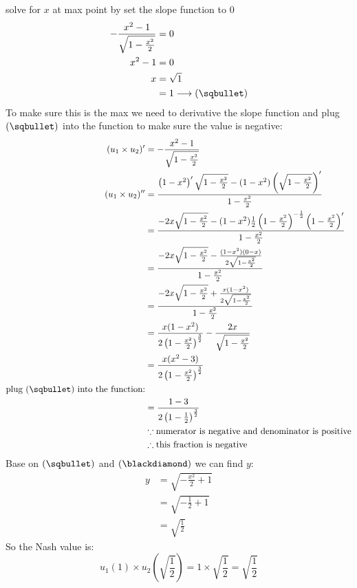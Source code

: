 \documentclass{article}
\begin{document}
solve for $x$ at max point by set the slope function to $0$
\begin{align*}
-\frac{x^2 - 1}{\sqrt{1 - \frac{x^2}{2}}} &= 0\\
x^2 - 1 &= 0\\
x &= \sqrt{1}\\
&= 1 \longrightarrow (\sqbullet)
\end{align*} 
To make sure this is the max we need to derivative the slope function and plug $(\sqbullet)$ into the function to make sure the value is negative:
\begin{align*}
(u_1 \times u_2)' &= -\frac{x^2 - 1}{\sqrt{1 - \frac{x^2}{2}}}\\
(u_1 \times u_2)'' &= \frac{\left(1-x^2\right)'\sqrt{1 - \frac{x^2}{2}} - (1-x^2)\left(\sqrt{1 - \frac{x^2}{2}}\right)'}{1- \frac{x^2}{2}}\\
&= \frac{-2x\sqrt{1-\frac{x^2}{2}} - (1-x^2)\frac{1}{2}\left(1-\frac{x^2}{2}\right)^{-\frac{1}{2}}\left(1-\frac{x^2}{2}\right)'}{1-\frac{x^2}{2}}\\
&= \frac{-2x\sqrt{1-\frac{x^2}{2}} - \frac{(1-x^2)(0-x)}{2\sqrt{1 - \frac{x^2}{2}}}}{1-\frac{x^2}{2}}\\
&= \frac{-2x\sqrt{1-\frac{x^2}{2}} + \frac{x(1-x^2)}{2\sqrt{1 - \frac{x^2}{2}}}}{1-\frac{x^2}{2}}\\
&= \frac{x(1-x^2)}{2\left(1 - \frac{x^2}{2}\right)^{\frac{3}{2}}} - \frac{2x}{\sqrt{1-\frac{x^2}{2}}}\\
&= \frac{x(x^2-3)}{2\left(1-\frac{x^2}{2}\right)^{\frac{3}{2}}}\\
\text{plug $(\sqbullet)$ into the function:}\\
&= \frac{1-3}{2\left(1-\frac{1}{2}\right)^{\frac{3}{2}}}\\
&\because \text{numerator is negative and denominator is positive}\\
&\therefore \text{this fraction is negative}
\end{align*} 
Base on $(\sqbullet)$ and $(\blackdiamond)$ we can find $y$:
\begin{align*}
y &= \sqrt{-\frac{x^2}{2} + 1}\\
&= \sqrt{-\frac{1}{2} + 1}\\
&= \sqrt{\frac{1}{2}}
\end{align*} 
So the Nash value is:
$$u_1(1) \times u_2\left(\sqrt{\frac{1}{2}}\right) = 1 \times \sqrt{\frac{1}{2}} = \sqrt{\frac{1}{2}}$$

\newpage
\end{document}
